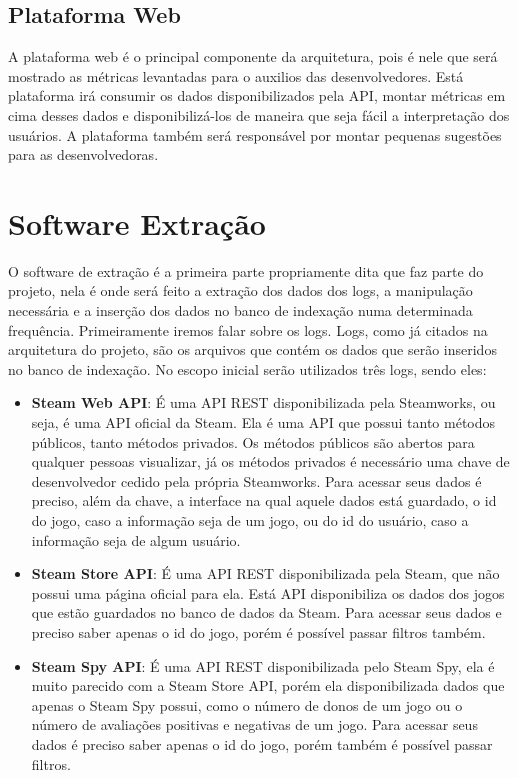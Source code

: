 \subsection{Plataforma Web}
A plataforma web é o principal componente da arquitetura, pois é nele que será mostrado as métricas levantadas para o auxilios das desenvolvedores. Está plataforma irá consumir os dados disponibilizados pela API, montar métricas em cima desses dados e disponibilizá-los de maneira que seja fácil a interpretação dos usuários. A plataforma também será responsável por montar pequenas sugestões para as desenvolvedoras.

\section{Software Extração}
O software de extração é a primeira parte propriamente dita que faz parte do projeto, nela é onde será feito a extração dos dados dos logs, a manipulação necessária e a inserção dos dados no banco de indexação numa determinada frequência. Primeiramente iremos falar sobre os logs. Logs, como já citados na arquitetura do projeto, são os arquivos que contém os dados que serão inseridos no banco de indexação. No escopo inicial serão utilizados três logs, sendo eles:
\begin{itemize}
	\item \textbf{Steam Web API}: É uma API REST disponibilizada pela Steamworks, ou seja, é uma API oficial da Steam\cite{steam_api}. Ela é uma API que possui tanto métodos públicos, tanto métodos privados. Os métodos públicos são abertos para qualquer pessoas visualizar, já os métodos privados é necessário uma chave de desenvolvedor cedido pela própria Steamworks. Para acessar seus dados é preciso, além da chave, a interface na qual aquele dados está guardado, o id do jogo, caso a informação seja de um jogo, ou do id do usuário, caso a informação seja de algum usuário.
	\item \textbf{Steam Store API}: É uma API REST disponibilizada pela Steam, que não possui uma página oficial para ela. Está API disponibiliza os dados dos jogos que estão guardados no banco de dados da Steam. Para acessar seus dados e preciso saber apenas o id do jogo, porém é possível passar filtros também.
	\item \textbf{Steam Spy API}: É uma API REST disponibilizada pelo Steam Spy\cite{steam_spy}, ela é muito parecido com a Steam Store API, porém ela disponibilizada dados que apenas o Steam Spy possui, como o número de donos de um jogo ou o número de avaliações positivas e negativas de um jogo. Para acessar seus dados é preciso saber apenas o id do jogo, porém também é possível passar filtros.
\end{itemize}
